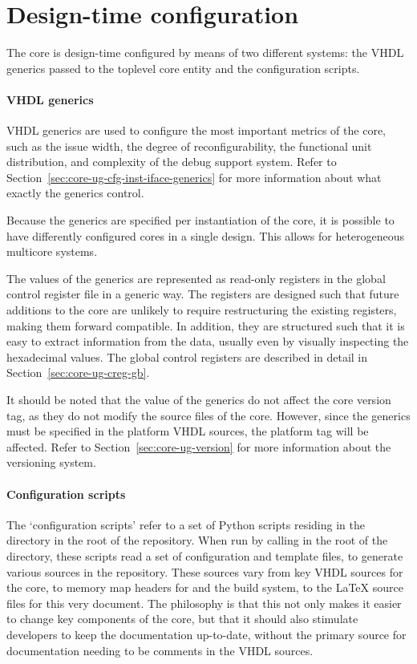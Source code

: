 
\clearpage
\section{Design-time configuration}
\label{sec:core-ug-cfg}

The \rvex{} core is design-time configured by means of two different systems:
the VHDL generics passed to the toplevel core entity and the configuration
scripts.

\paragraph*{VHDL generics} VHDL generics are used to configure the most 
important metrics of the core, such as the issue width, the degree of 
reconfigurability, the functional unit distribution, and complexity of the debug 
support system. Refer to Section~\ref{sec:core-ug-cfg-inst-iface-generics} for 
more information about what exactly the generics control.

Because the generics are specified per instantiation of the core, it is possible
to have differently configured \rvex{} cores in a single design. This allows for
heterogeneous multicore systems.

The values of the generics are represented as read-only registers in the global
control register file in a generic way. The registers are designed such that
future additions to the core are unlikely to require restructuring the existing
registers, making them forward compatible. In addition, they are structured such
that it is easy to extract information from the data, usually even by visually
inspecting the hexadecimal values. The global control registers are described in
detail in Section~\ref{sec:core-ug-creg-gb}.

It should be noted that the value of the generics do not affect the core version
tag, as they do not modify the source files of the core. However, since the
generics must be specified in the platform VHDL sources, the platform tag will
be affected. Refer to Section~\ref{sec:core-ug-version} for more information
about the versioning system.

\paragraph*{Configuration scripts} The `configuration scripts' refer to a set of 
Python scripts residing in the  directory in the root of the 
\rvex{} repository. When run by calling  in the root of the 
 directory, these scripts read a set of configuration and template 
files, to generate various sources in the repository. These sources vary from 
key VHDL sources for the \rvex{} core, to memory map headers for  and 
the build system, to the LaTeX source files for this very document. The 
philosophy is that this not only makes it easier to change key components of the 
core, but that it should also stimulate developers to keep the documentation 
up-to-date, without the primary source for documentation needing to be comments 
in the VHDL sources.

